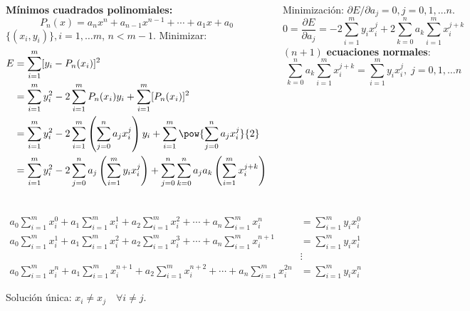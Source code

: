 \documentclass[9pt, aspectratio=169]{beamer}
\begin{document}
\begin{frame}
    \begin{columns}[t]
\cx
\textbf{Mínimos cuadrados polinomiales:}
\[ P_n(x) = a_n x^n + a_{n-1} x^{n-1} + \cdots + a_1 x + a_0 \]
$\{(x_i, y_i)\}, i = 1, \ldots m$, $n < m-1$. Minimizar:
\begin{align*}
    E &= \sum_{i=1}^m [y_i - P_n(x_i)]^2 \\
      &= \sum_{i=1}^m y_i^2 - 2 \sum_{i=1}^m P_n(x_i) y_i + \sum_{i=1}^m [P_n(x_i)]^2 \\
      &= \sum_{i=1}^m y_i^2 -2 \sum_{i=1}^m \left(\sum_{j=0}^n a_j x_i^j \right) y_i + \sum_{i=1}^m \pow{\sum_{j=0}^n a_j x_i^j}{2} \\
      &= \sum_{i=1}^m y_i^2 -2 \sum_{j=0}^n a_j \left( \sum_{i=1}^m y_i x_i^j \right) + \sum_{j=0}^n \sum_{k=0}^n a_j a_k \left( \sum_{i=1}^m x_i^{j+k} \right) 
\end{align*}
\pause

Minimización: $\partial E / \partial a_j = 0, j = 0, 1, \ldots n$.
\[ 0 = \frac{\partial E}{\partial a_j} = -2 \sum_{i=1}^m y_i x_i^j + 2 \sum_{k=0}^na_k \sum_{i=1}^m x_i^{j+k} \]
$(n+1)$ \textbf{ecuaciones normales}:
\[ \sum_{k=0}^n a_k \sum_{i=1}^m x_i^{j+k} = \sum_{i=1}^m y_i x_i^j, \; j=0, 1, \ldots n \]
\end{columns}
\end{frame}

\begin{frame}
\begin{align*}
    a_0 \sum_{i=1}^m x_i^0 + a_1 \sum_{i=1}^m x_i^1 + a_2 \sum_{i=1}^m x_i^2 + \cdots + a_n \sum_{i=1}^m x_i^n &= \sum_{i=1}^m y_i x_i^0 \\ 
    a_0 \sum_{i=1}^m x_i^1 + a_1 \sum_{i=1}^m x_i^2 + a_2 \sum_{i=1}^m x_i^3 + \cdots + a_n \sum_{i=1}^m x_i^{n+1} &= \sum_{i=1}^m y_i x_i^1 \\
                                                                                                                     &\vdots \\
    a_0 \sum_{i=1}^m x_i^n + a_1 \sum_{i=1}^m x_i^{n+1} + a_2 \sum_{i=1}^m x_i^{n+2} + \cdots + a_n \sum_{i=1}^m x_i^{2n} &= \sum_{i=1}^m y_i x_i^n  
\end{align*}

\centering \alert{Solución única:} $x_i \neq x_j \quad \forall i \neq j$.
\end{frame}
\end{document}
